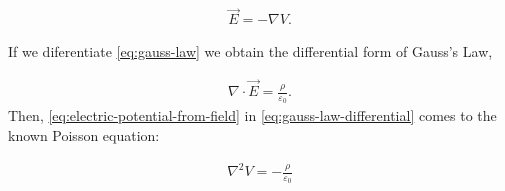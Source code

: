 \documentclass[twoside]{article}
\begin{document}
    \begin{align}
        \vec{E} = -\nabla V. \label{eq:electric-potential-from-field}
    \end{align}

If we diferentiate \eqref{eq:gauss-law} we obtain the differential form of Gauss's Law, 

    \begin{align}
        \nabla \cdot \vec{E} = \frac{\rho}{\varepsilon_0}. \label{eq:gauss-law-differential}
    \end{align}
Then, \eqref{eq:electric-potential-from-field} in \eqref{eq:gauss-law-differential} comes to the known Poisson equation:

    \begin{align}
        \nabla^2 V = - \frac{\rho}{\varepsilon_0}
    \end{align}
\end{document}
